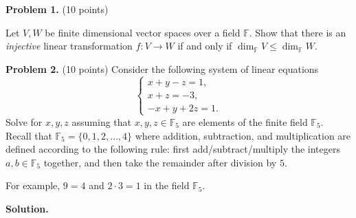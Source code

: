 \documentclass[11pt]{exam}
\begin{document}

\newpage %

%
%
%

{\bf Problem 1.} (10 points) 

Let $V,W$ be finite dimensional vector spaces over a field $\mathbb{F}$. Show that there is an \emph{injective} linear transformation $f\colon V \to W$ if and only if $\dim_{\mathbb{F}}V\leq \dim_{\mathbb{F}}W$.

\newpage


{\bf Problem 2.} (10 points) Consider the following system of linear equations
$$\begin{cases} x +y - z=1,\\ x+z=-3,\\ -x+y+2z=1.\end{cases}$$
Solve for $x,y,z$ assuming that $x,y,z \in \mathbb{F}_5$ are elements of the finite field $\mathbb{F}_5$. Recall that $\mathbb{F}_5=\{0,1,2,\dots, 4\}$ where addition, subtraction, and multiplication are defined according to the following rule: first add/subtract/multiply the integers $a,b\in\mathbb{F}_5$ together, and then take the remainder after division by $5$. 

\noindent For example, $9=4$ and $2\cdot 3=1$ in the field $\mathbb{F}_5$.
\iffalse
\bigskip

{\bf Solution. }
\end{document}

